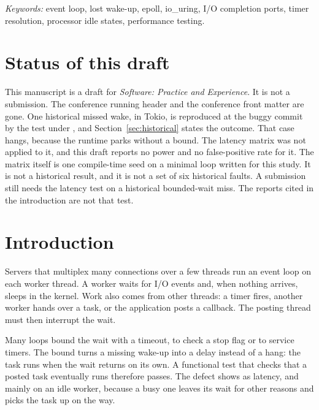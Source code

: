 \noindent\textit{Keywords:} event loop, lost wake-up, epoll, io\_uring, I/O completion ports,
timer resolution, processor idle states, performance testing.

\section*{Status of this draft}
\label{sec:status}

This manuscript is a draft for \emph{Software: Practice and Experience}. It is not a
submission. The conference running header and the conference front matter are gone. One
historical missed wake, in Tokio, is reproduced at the buggy commit by the test under
, and Section~\ref{sec:historical} states the
outcome. That case hangs, because the runtime parks without a bound. The latency matrix was
not applied to it, and this draft reports no power and no false-positive rate for it. The
matrix itself is one compile-time seed on a minimal loop written for this study. It is not
a historical result, and it is not a set of six historical faults. A submission still needs
the latency test on a historical bounded-wait miss. The reports cited in the introduction
are not that test.

\section{Introduction}

Servers that multiplex many connections over a few threads run an event loop on each worker
thread. A worker waits for I/O events and, when nothing arrives, sleeps in the kernel. Work
also comes from other threads: a timer fires, another worker hands over a task, or the
application posts a callback. The posting thread must then interrupt the wait.

Many loops bound the wait with a timeout, to check a stop flag or to service timers. The bound
turns a missing wake-up into a delay instead of a hang: the task runs when the wait returns on
its own. A functional test that checks that a posted task eventually runs therefore passes. The
defect shows as latency, and mainly on an idle worker, because a busy one leaves its wait for
other reasons and picks the task up on the way.

